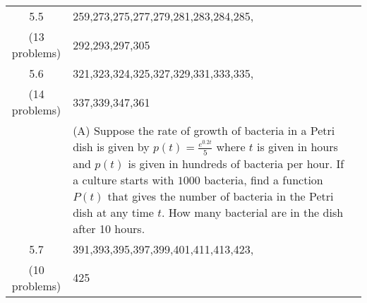 \documentclass[11pt,fleqn]{article}
\begin{document}
\begin{tabularx}{\textwidth}{|c|| X | X | }
5.5&259,273,275,277,279,281,283,284,285,& \\ 
(13 problems)&292,293,297,305& \\ \hline

5.6&321,323,324,325,327,329,331,333,335,& \\ 
(14 problems)&337,339,347,361&\\
&(A) Suppose the rate of growth of bacteria in a Petri dish is given by $p(t)=\frac{e^{0.2t}}{5}$ where $t$ is given in hours and $p(t)$ is given in hundreds of bacteria per hour. If a culture starts with $1000$ bacteria, find a function $P(t)$ that gives the number of bacteria in the Petri dish at any time $t.$ How many bacterial are in the dish after 10  hours. & \\ \hline

5.7&391,393,395,397,399,401,411,413,423,& \\ 
(10 problems) &425& \\ \hline


\end{tabularx}
\vfill
\end{document}
